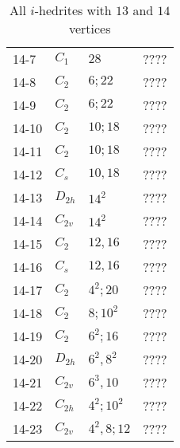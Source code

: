 \documentclass[12pt]{article}
\begin{document}
\begin{table}
\begin{center}
{\begin{minipage}[t]{6cm}
\begin{tabular}{||l|l|l|l||}
14-7 	&$C_1$	&$28$		&????\\
14-8	&$C_{2}$	&$6; 22$		&????\\
14-9 	&$C_2$	&$6; 22$		&????\\
14-10	&$C_2$	&$10; 18$		&????\\
14-11	&$C_2$	&$10; 18$		&????\\
14-12	&$C_s$	&$10, 18$		&????\\
14-13	&$D_{2h}$	&$14^2$		&????\\
14-14	&$C_{2v}$	&$14^2$		&????\\
14-15	&$C_2$	&$12, 16$		&????\\
14-16	&$C_{s}$	&$12, 16$		&????\\
14-17	&$C_2$	&$4^2; 20$	&????\\
14-18	&$C_2$	&$8; 10^2$	&????\\
14-19	&$C_2$	&$6^2; 16$	&????\\
14-20	&$D_{2h}$	&$6^2, 8^2$	&????\\
14-21	&$C_{2v}$	&$6^3, 10$	&????\\
14-22	&$C_{2h}$	&$4^2; 10^2$	&????\\
14-23	&$C_{2v}$	&$4^2, 8; 12$	&????\\\hline
\end{tabular}
\end{minipage}
}
\end{center}
\caption{All $i$-hedrites with $13$ and $14$ vertices}
\label{tab:i-hedrite13_14}
\end{table}
\end{document}
